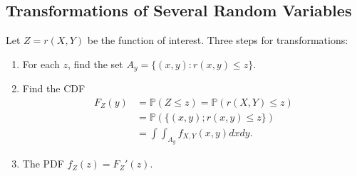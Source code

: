 \documentclass{article}
\theoremstyle{remark}
\newcommand{\1}{\mathbf{1}}
\newcommand{\Prob}{\mathbb{P}}
\begin{document}
\subsection{Transformations of Several Random Variables}
Let $Z = r(X,Y)$ be the function of interest.
\noindent Three steps for transformations:
\begin{enumerate}
	\item For each $z$, find the set $A_y = \{(x,y): r(x,y) \leq z\}$.
	\item Find the CDF 
	\[
	\begin{split}
	F_Z(y) 	&= \Prob(Z \leq z) = \Prob(r(X,Y) \leq z) \\
	&= \Prob(\{(x,y); r(x,y) \leq z\}) \\
	&= \int\int_{A_y} f_{X,Y}(x,y)dxdy.
	\end{split}
	\]
	\item The PDF $f_Z(z) = F_Z'(z)$. 
\end{enumerate}
\end{document}
